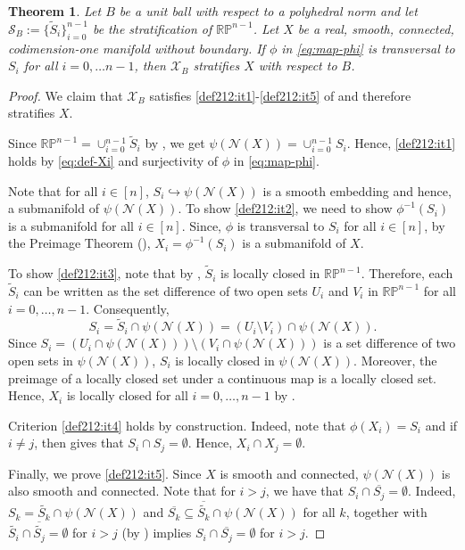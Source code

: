 \documentclass{article}
\newtheorem{theorem}{Theorem}
\numberwithin{theorem}{section}
\theoremstyle{definition}
\theoremstyle{example_contd}
\newcommand{\N}{\mathcal{N}}
\newcommand{\Rp}{{\mathbb{RP}}}
\newcommand{\pn}{{\psi(\N(X))}}
\renewcommand{\S}{\mathcal{S}}
\begin{document}
\begin{theorem}\label{thm:stratgeneral}
	Let $B$ be a unit ball with respect to a polyhedral norm and let $\S_B:=\{\tilde{S}_i\}_{i=0}^{n-1}$ be the stratification of $\Rp^{n-1}$. Let $X$  be a real, smooth, connected, codimension-one manifold without boundary. If $\phi$ in \eqref{eq:map-phi} is transversal to $S_i$ for all $i=0,\ldots n-1$, then $\mathcal{X}_B$ stratifies $X$ with respect to $B$.
\end{theorem}

\begin{proof}
	We claim that $\mathcal{X}_B$ satisfies \ref{def212:it1}-\ref{def212:it5} of  and therefore stratifies $X$. 
	
	Since $\Rp^{n-1}=\cup_{i=0}^{n-1}\tilde{S}_i$ by , we get $\psi(\N(X))=\cup_{i=0}^{n-1}S_i$. Hence, \ref{def212:it1} holds by \eqref{eq:def-Xi} and surjectivity of $\phi$ in \eqref{eq:map-phi}.
	
	 Note that for all $i\in [n]$, $S_i\hookrightarrow \psi(\N(X))$ is a smooth embedding and hence, a submanifold of $\psi(\N(X))$. To show \ref{def212:it2}, we need to show $\phi^{-1}(S_i)$ is a submanifold for all $i\in[n]$. Since, $\phi$ is transversal to $S_i$ for all $i\in [n]$, by the Preimage Theorem (), $X_i=\phi^{-1}(S_i)$ is a submanifold of $X$.
	
	To show \ref{def212:it3}, note that by , $\tilde{S}_i$ is locally closed in $\Rp^{n-1}$. Therefore, each $\tilde{S}_i$ can be written as the set difference of two open sets $U_i$ and $V_i$ in $\Rp^{n-1}$ for all $i=0,\ldots, n-1.$
	Consequently, 
    $$S_i=\tilde{S}_i\cap \psi(\N(X))=(U_i\setminus V_i)\cap \psi(\N(X)).$$ 
    Since $S_i=(U_i\cap \psi(\N(X)))\setminus (V_i\cap \psi(\N(X)))$ is a set difference of two open sets in $ \psi(\N(X))$, $S_i$ is locally closed in $\psi(\N(X))$. Moreover, the preimage of a locally closed set under a continuous map is a locally closed set. Hence, $X_i$ is locally closed for all $i=0,\ldots,n-1$ by .
	
	
	Criterion \ref{def212:it4} holds by construction. Indeed, note that $\phi(X_i)= S_i$ and if $i\neq j$, then  gives that $S_i\cap S_j=\emptyset$. Hence, $X_i\cap X_j=\emptyset.$
	
	Finally, we prove \ref{def212:it5}. Since $X$ is smooth and connected, $\pn$ is also smooth and connected. Note that for $i>j$, we have that $S_i\cap \overline{S_j}=\emptyset$. Indeed,  $S_k=\tilde{S_k}\cap \psi(\N(X))$ and $\overline{S_k}\subseteq\overline{\tilde{S_k}}\cap \psi(\N(X))$ for all $k$, together with $\tilde{S_i}\cap \overline{\tilde{S_j}}=\emptyset$ for $i>j$ (by ) implies $S_i\cap \overline{S_j}=\emptyset$ for $i>j$. 
    

\end{proof}
\end{document}
